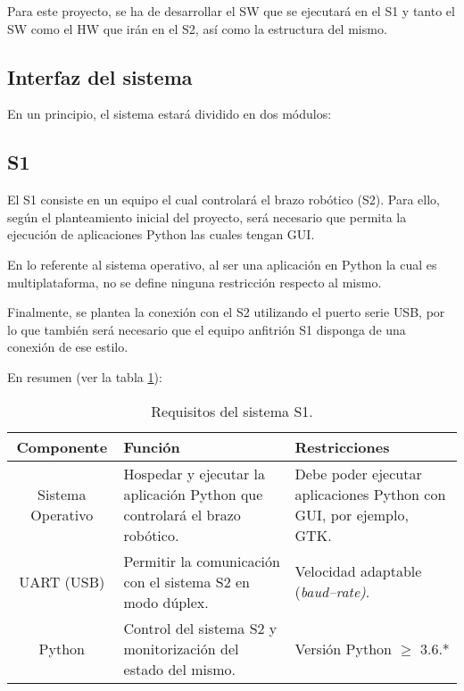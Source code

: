 Para este proyecto, se ha de desarrollar el \ac{SW} que se ejecutará en el \ac{S1} y tanto el \ac{SW} como el \ac{HW} que irán en el \ac{S2}, así como la estructura del mismo.

\subsection{Interfaz del sistema}
En un principio, el sistema estará dividido en dos módulos:

\subsection*{\ac{S1}}
El \ac{S1} consiste en un equipo el cual controlará el brazo robótico (\ac{S2}). Para ello, según el planteamiento inicial del proyecto, será necesario que permita la ejecución de aplicaciones Python las cuales tengan \ac{GUI}.

En lo referente al sistema operativo, al ser una aplicación en Python la cual es multiplataforma, no se define ninguna restricción respecto al mismo.

Finalmente, se plantea la conexión con el \ac{S2} utilizando el puerto serie \ac{USB}, por lo que también será necesario que el equipo anfitrión \ac{S1} disponga de una conexión de ese estilo.

En resumen (ver la tabla \ref{tab:s1_requirements}):

\begin{table}[H]
    \centering
    \begin{tabularx}{\textwidth}{| c | X | X |}
        \hline
        \textbf{Componente} & \textbf{Función} & \textbf{Restricciones} \\
        \hline\hline
        Sistema Operativo & Hospedar y ejecutar la aplicación Python que controlará el brazo robótico. & Debe poder ejecutar aplicaciones Python con \ac{GUI}, por ejemplo, \ac{GTK}. \\
        \hline
        UART (\ac{USB}) & Permitir la comunicación con el sistema \ac{S2} en modo dúplex. & Velocidad adaptable (\textit{baud--rate)}. \\
        \hline
        Python & Control del sistema \ac{S2} y monitorización del estado del mismo. & Versión Python $\geqslant$ 3.6.* \\
        \hline
    \end{tabularx}
    \caption{Requisitos del sistema \ac{S1}.}
    \label{tab:s1_requirements}
\end{table}

